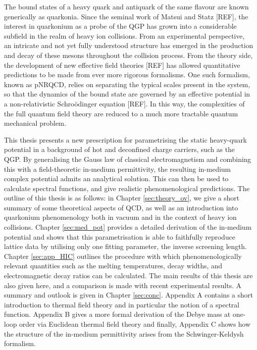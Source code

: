 \documentclass[12pt, a4paper, twoside]{book}
\begin{document}
The bound states of a heavy quark and antiquark of the same flavour are known generically as quarkonia. Since the seminal work of Matsui and Statz [REF], the interest in quarkonium as a probe of the QGP has grown into a considerable subfield in the realm of heavy ion collisions. From an experimental perspective, an intricate and not yet fully understood structure has emerged in the production and decay of these mesons throughout the collision process. From the theory side, the development of new effective field theories [REF] has allowed quantitative predictions to be made from ever more rigorous formalisms. One such formalism, known as pNRQCD, relies on separating the typical scales present in the system, so that the dynamics of the bound state are governed by an effective potential in a non-relativistic Schro{\"o}dinger equation [REF]. In this way, the complexities of the full quantum field theory are reduced to a much more tractable quantum mechanical problem.

This thesis presents a new prescription for parametrising the static heavy-quark potential in a background of hot and deconfined charge carriers, such as the QGP. By generalising the Gauss law of classical electromagnetism and combining this with a field-theoretic in-medium permittivity, the resulting in-medium complex potential admits an analytical solution. This can then be used to calculate spectral functions, and give realistic phenomenological predictions. The outline of this thesis is as follows: in Chapter \ref{sec:theory_ov}, we give a short summary of some theoretical aspects of QCD, as well as an introduction into quarkonium phenomenology both in vacuum and in the context of heavy ion collisions. Chapter \ref{sec:med_pot} provides a detailed derivation of the in-medium potential and shows that this parametrisation is able to faithfully reproduce lattice data by utilising only one fitting parameter, the inverse screening length. Chapter \ref{sec:app_HIC} outlines the procedure with which phenomenologically relevant quantities such as the melting temperatures, decay widths, and electromagnetic decay ratios can be calculated. The main results of this thesis are also given here, and a comparison is made with recent experimental results. A summary and outlook is given in Chapter \ref{sec:conc}. Appendix A contains a short introduction to thermal field theory and in particular the notion of a spectral function. Appendix B gives a more formal derivation of the Debye mass at one-loop order via Euclidean thermal field theory and finally, Appendix C shows how the structure of the in-medium permittivity arises from the Schwinger-Keldysh formalism. 
\end{document}
